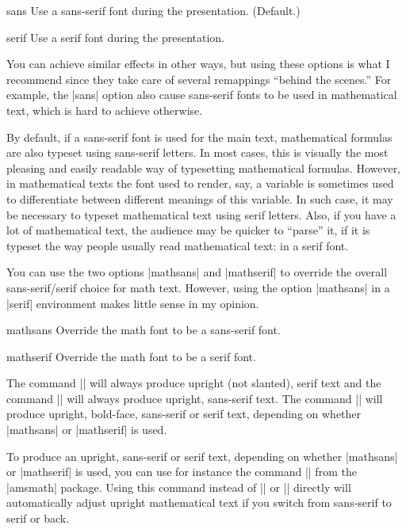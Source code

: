 \begin{classoption}{sans}
  Use a sans-serif font during the presentation. (Default.)
\end{classoption}

\begin{classoption}{serif}
  Use a serif font during the presentation.
\end{classoption}

You can achieve similar effects in other ways, but using these options
is what I recommend since they take care of several remappings
``behind the scenes.'' For example, the |sans| option also cause
sans-serif fonts to be used in mathematical text, which is hard to
achieve otherwise.

By default, if a sans-serif font is used for the main text,
mathematical formulas are also typeset using sans-serif letters. In
most cases, this is visually the most pleasing and easily readable way of
typesetting mathematical formulas. However, in mathematical texts the
font used to render, say, a variable is sometimes used to
differentiate between different meanings of this variable. In such
case, it may be necessary to typeset mathematical text using serif
letters. Also, if you have a lot of mathematical text, the audience
may be quicker to ``parse'' it, if it is typeset the way people
usually read mathematical text: in a serif font.

You can use the two options |mathsans| and |mathserif| to override the
overall sans-serif/serif choice for math text. However, using the option
|mathsans| in a |serif| environment makes little sense in my opinion.

\begin{classoption}{mathsans}
  Override the math font to be a sans-serif font.
\end{classoption}

\begin{classoption}{mathserif}
  Override the math font to be a serif font.
\end{classoption}

The command |\mathrm| will always produce upright (not slanted), serif
text and the command |\mathsf| will always produce upright, sans-serif
text. The command |\mathbf| will produce upright, bold-face,
sans-serif or serif text, depending on whether |mathsans| or
|mathserif| is used.

To produce an upright, sans-serif or serif text, depending on
whether |mathsans| or |mathserif| is used, you can use for instance
the command |\operatorname| from the |amsmath| package. Using this
command instead of |\mathrm| or |\mathsf| directly will  automatically
adjust  upright mathematical text if you switch from sans-serif to
serif or back.


